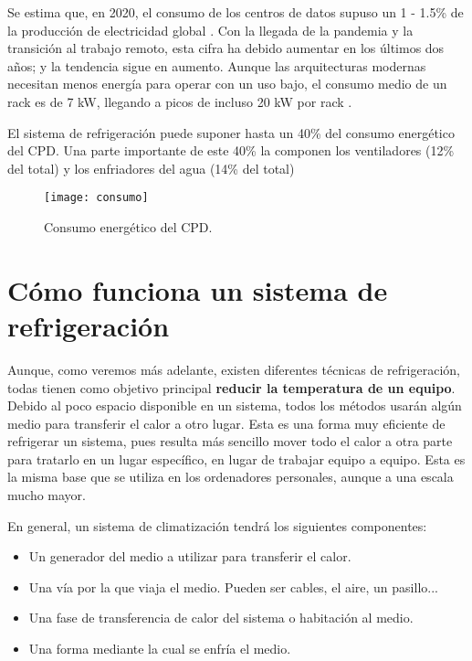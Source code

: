 Se estima que, en 2020, el consumo de los centros de datos supuso un 1 - 1.5\% de la producción de electricidad global \cite{mytton-dc}. Con la llegada de la pandemia y la transición al trabajo remoto, esta cifra ha debido aumentar en los últimos dos años; y la tendencia sigue en aumento. Aunque las arquitecturas modernas necesitan menos energía para operar con un uso bajo, el consumo medio de un rack es de 7 kW, llegando a picos de incluso 20 kW por rack \cite{datacenters-density}.

El sistema de refrigeración puede suponer hasta un 40\% del consumo energético del CPD. Una parte importante de este 40\% la componen los ventiladores (12\% del total) y los enfriadores del agua (14\% del total) \cite{ZHANG2021102253}

\begin{figure}
    \begin{center}
    \caption{Consumo energético del CPD.}
    \label{consumo_energetico}
    \texttt{[image: consumo]}
    \end{center}
\end{figure}

\section{Cómo funciona un sistema de refrigeración}

Aunque, como veremos más adelante, existen diferentes técnicas de refrigeración, todas tienen como objetivo principal \textbf{reducir la temperatura de un equipo}. Debido al poco espacio disponible en un sistema, todos los métodos usarán algún medio para transferir el calor a otro lugar. Esta es una forma muy eficiente de refrigerar un sistema, pues resulta más sencillo mover todo el calor a otra parte para tratarlo en un lugar específico, en lugar de trabajar equipo a equipo. Esta es la misma base que se utiliza en los ordenadores personales, aunque a una escala mucho mayor.

En general, un sistema de climatización tendrá los siguientes componentes:

\begin{itemize}
    \item Un generador del medio a utilizar para transferir el calor.
    \item Una vía por la que viaja el medio. Pueden ser cables, el aire, un pasillo...
    \item Una fase de transferencia de calor del sistema o habitación al medio.
    \item Una forma mediante la cual se enfría el medio.
\end{itemize}

